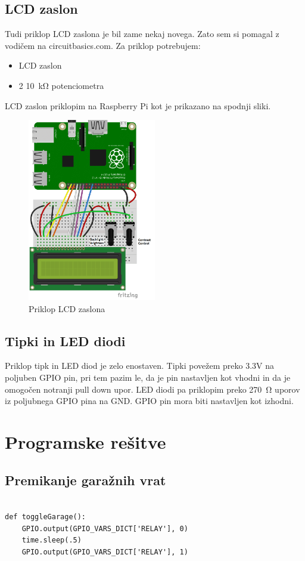\documentclass[11pt]{article}
\begin{document}
\subsection{LCD zaslon}
Tudi priklop LCD zaslona je bil zame nekaj novega. Zato sem si pomagal z vodičem na circuitbasics.com\cite{CB_LCD}.
Za priklop potrebujem:
\begin{itemize}
    \item LCD zaslon
    \item 2 \SI{10}{\kohm} potenciometra
\end{itemize}
LCD zaslon priklopim na Raspberry Pi kot je prikazano na spodnji sliki.
\begin{figure}[h]
\centering
\includegraphics[width=0.5\textwidth]{images/LCD_4bit.png}
\caption{Priklop LCD zaslona}
\end{figure}
\newpage
\subsection{Tipki in LED diodi}
Priklop tipk in LED diod je zelo enostaven. Tipki povežem preko 3.3V na poljuben GPIO pin, pri tem pazim le, da je pin nastavljen kot vhodni in da je omogočen notranji pull down upor.
LED diodi pa priklopim preko \SI{270}{\ohm} uporov iz poljubnega GPIO pina na GND. GPIO pin mora biti nastavljen kot izhodni.
\section{Programske rešitve}
\subsection{Premikanje garažnih vrat}
\begin{verbatim}
  
def toggleGarage():
    GPIO.output(GPIO_VARS_DICT['RELAY'], 0)
    time.sleep(.5)
    GPIO.output(GPIO_VARS_DICT['RELAY'], 1)
\end{verbatim}
\end{document}
